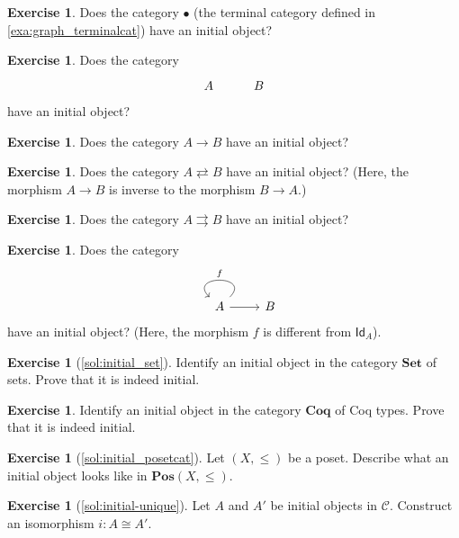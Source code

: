 \documentclass[a4paper,11pt, oneside,titlepage=false]{scrbook}
\theoremstyle{plain}
\theoremstyle{definition}
\newtheorem{exer}[thm]{Exercise}
\newcommand{\cfont}[1]{\ensuremath{\mathsf{#1}}}
\newcommand{\Cat}[1]{\mathcal{#1}}
\newcommand{\CC}{\Cat{C}}
\newcommand{\Catb}[1]{\mathbf{#1}}
\newcommand{\SET}{\Catb{Set}}
\newcommand{\POS}{\Catb{Pos}}
\newcommand{\COQ}{\Catb{Coq}}
\newcommand{\Id}[1][]{\cfont{Id}_{#1}}
\begin{document}
\begin{exer}
  Does the category $\bullet$ (the terminal category defined in \cref{exa:graph_terminalcat}) have an initial object?
\end{exer}

\begin{exer}
  Does the category 
  \[ 
  \begin{tikzcd}
  	A & B
  \end{tikzcd}  
   \] 
  have an initial object?
\end{exer}


\begin{exer}
  Does the category $A \to B$ have an initial object?
\end{exer}

\begin{exer}
  Does the category $A \rightleftarrows B$ have an initial object? (Here, the morphism $A \to B$ is inverse to the morphism $B \to A$.)
\end{exer}

\begin{exer}
  Does the category $A \rightrightarrows B$ have an initial object?
\end{exer}

\begin{exer}
  Does the category 
  \[
  \begin{tikzcd}
  A \arrow[r] \arrow[loop, swap, looseness=4, "f"] & B
  \end{tikzcd}
  \]
  have an initial object? (Here, the morphism $f$ is different from $\Id[A]$).
\end{exer}

\begin{exer}[\cref{sol:initial_set}]\label{exer:initial_set}
  Identify an initial object in the category $\SET$ of sets.
  Prove that it is indeed initial.
\end{exer}

\begin{exer}
  Identify an initial object in the category $\COQ$ of Coq types.
  Prove that it is indeed initial.
\end{exer}

\begin{exer}[\cref{sol:initial_posetcat}]\label{exer:initial_posetcat}
  Let $(X,\leq)$ be a poset. Describe what an initial object looks like in  $\POS(X,\leq)$.
\end{exer}

\begin{exer}[\cref{sol:initial-unique}]\label{exer:initial-unique}
  Let $A$ and $A'$ be initial objects in $\CC$. Construct an isomorphism $i : A \cong A'$.
\end{exer}
\end{document}
